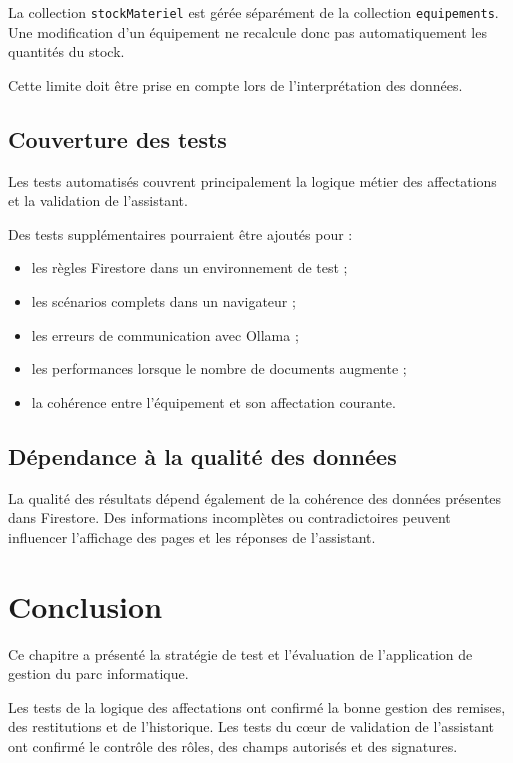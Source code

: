 \documentclass{rapportENSIAS}
\begin{document}
La collection \texttt{stockMateriel} est gérée séparément de la collection \texttt{equipements}. Une modification d’un équipement ne recalcule donc pas automatiquement les quantités du stock.

Cette limite doit être prise en compte lors de l’interprétation des données.

\subsection{Couverture des tests}

Les tests automatisés couvrent principalement la logique métier des affectations et la validation de l’assistant.

Des tests supplémentaires pourraient être ajoutés pour :

\begin{itemize}
    \item les règles Firestore dans un environnement de test ;
    \item les scénarios complets dans un navigateur ;
    \item les erreurs de communication avec Ollama ;
    \item les performances lorsque le nombre de documents augmente ;
    \item la cohérence entre l’équipement et son affectation courante.
\end{itemize}

\subsection{Dépendance à la qualité des données}

La qualité des résultats dépend également de la cohérence des données présentes dans Firestore. Des informations incomplètes ou contradictoires peuvent influencer l’affichage des pages et les réponses de l’assistant.

\section{Conclusion}

Ce chapitre a présenté la stratégie de test et l’évaluation de l’application de gestion du parc informatique.

Les tests de la logique des affectations ont confirmé la bonne gestion des remises, des restitutions et de l’historique. Les tests du cœur de validation de l’assistant ont confirmé le contrôle des rôles, des champs autorisés et des signatures.
\end{document}
